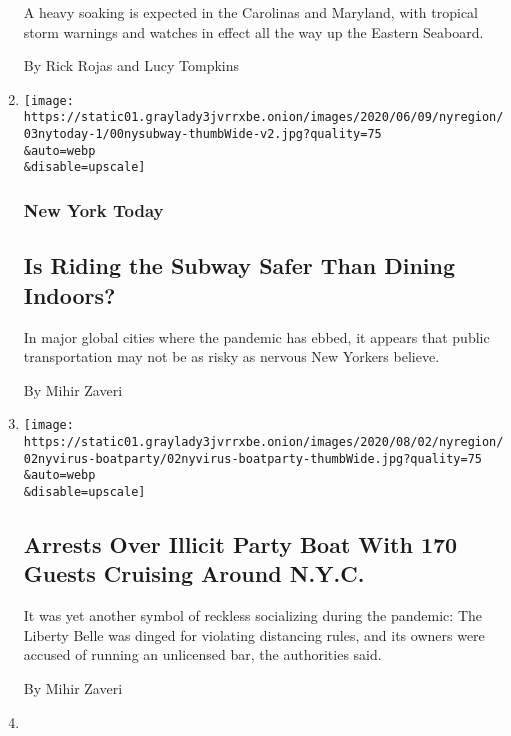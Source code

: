 \begin{enumerate}
  A heavy soaking is expected in the Carolinas and Maryland, with
  tropical storm warnings and watches in effect all the way up the
  Eastern Seaboard.

  By Rick Rojas and Lucy Tompkins
\item
  \href{/2020/08/03/nyregion/nyc-subway-coronavirus.html}{}

  \texttt{[image: https://static01.graylady3jvrrxbe.onion/images/2020/06/09/nyregion/03nytoday-1/00nysubway-thumbWide-v2.jpg?quality=75\\\&auto=webp\\\&disable=upscale]}

  \hypertarget{new-york-today}{%
  \subsubsection{New York Today}\label{new-york-today}}

  \hypertarget{is-riding-the-subway-safer-than-dining-indoors}{%
  \subsection{Is Riding the Subway Safer Than Dining
  Indoors?}\label{is-riding-the-subway-safer-than-dining-indoors}}

  In major global cities where the pandemic has ebbed, it appears that
  public transportation may not be as risky as nervous New Yorkers
  believe.

  By Mihir Zaveri
\item
  \href{/2020/08/02/nyregion/liberty-belle-illegal-party.html}{}

  \texttt{[image: https://static01.graylady3jvrrxbe.onion/images/2020/08/02/nyregion/02nyvirus-boatparty/02nyvirus-boatparty-thumbWide.jpg?quality=75\\\&auto=webp\\\&disable=upscale]}

  \hypertarget{arrests-over-illicit-party-boat-with-170-guests-cruising-around-nyc}{%
  \subsection{Arrests Over Illicit Party Boat With 170 Guests Cruising
  Around
  N.Y.C.}\label{arrests-over-illicit-party-boat-with-170-guests-cruising-around-nyc}}

  It was yet another symbol of reckless socializing during the pandemic:
  The Liberty Belle was dinged for violating distancing rules, and its
  owners were accused of running an unlicensed bar, the authorities
  said.

  By Mihir Zaveri
\item
  \href{/2020/07/31/nyregion/greenwich-ct-coronavirus-covid-parties.html}{}


\end{enumerate}
